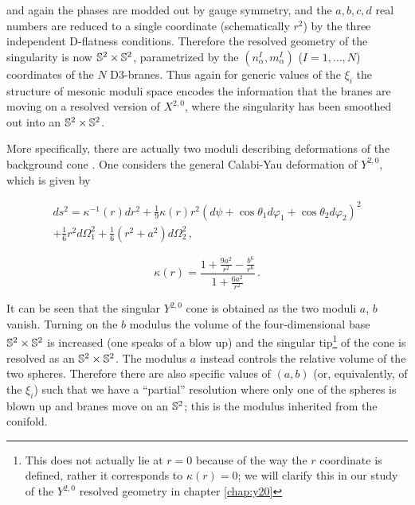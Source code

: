 and again the phases are modded out by gauge symmetry, and the $a, b, c, d$ real numbers are reduced to a single coordinate (schematically $r^2$) by the three independent D-flatness conditions. Therefore the resolved geometry of the singularity is now $\mathbb{S}^2 \times \mathbb{S}^2$, parametrized by the $(n^I_\alpha,m^I_\alpha)$ ($I=1,\ldots,N$) coordinates of the $N$ D3-branes. Thus again for generic values of the $\xi_i$ the structure of mesonic moduli space encodes the information that the branes are moving on a resolved version of $X^{2,0}$, where the singularity has been smoothed out into an $\mathbb{S}^2 \times \mathbb{S}^2$.

More specifically, there are actually two moduli describing deformations of the background cone \cite{Benvenutifourcycles}. One considers the general Calabi-Yau deformation of $Y^{2,0}$, which is given by \cite{PandoZayasy20}

\begin{equation}
	\begin{split}
	ds^2 = \kappa^{-1}(r) dr^2 + \frac{1}{9} \kappa(r) r^2 \left( d\psi + \cos\theta_1 d\varphi_1 + \cos\theta_2 d\varphi_2 \right)^2 \\
	+ \frac{1}{6} r^2 d\Omega_1^2 + \frac{1}{6}(r^2 + a^2) d\Omega_2^2\,,
	\label{genCYy20cones}
\end{split}
\end{equation}

\begin{equation}
	\kappa(r) = \frac{1 + \frac{9a^2}{r^2} - \frac{b^6}{r^6}}{1 + \frac{6a^2}{r^2}}\,.
	\label{}
\end{equation}

It can be seen that the singular $Y^{2,0}$ cone is obtained as the two moduli $a$, $b$ vanish. Turning on the $b$ modulus the volume of the four-dimensional base $\mathbb{S}^2\times \mathbb{S}^2$ is increased (one speaks of a blow up) and the singular tip\footnote{This does not actually lie at $r=0$ because of the way the $r$ coordinate is defined, rather it corresponds to $\kappa(r) = 0$; we will clarify this in our study of the $Y^{2,0}$ resolved geometry in chapter \ref{chap:y20}} of the cone is resolved as an $\mathbb{S}^2 \times \mathbb{S}^2$. The modulus $a$ instead controls the relative volume of the two spheres. Therefore there are also specific values of $(a,b)$ (or, equivalently, of the $\xi_i$) such that we have a ``partial'' resolution where only one of the spheres is blown up and branes move on an $\mathbb{S}^2$; this is the modulus inherited from the conifold.

